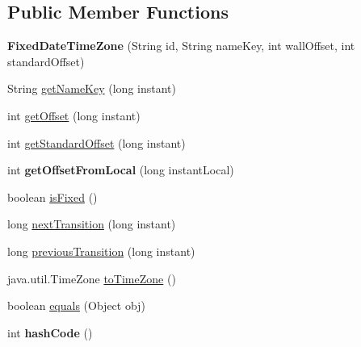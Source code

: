 \subsection*{Public Member Functions}
\begin{DoxyCompactItemize}
\item 
\hypertarget{classorg_1_1joda_1_1time_1_1tz_1_1_fixed_date_time_zone_abcb49765decd77a26771fd6b406f6ad4}{{\bfseries Fixed\-Date\-Time\-Zone} (String id, String name\-Key, int wall\-Offset, int standard\-Offset)}\label{classorg_1_1joda_1_1time_1_1tz_1_1_fixed_date_time_zone_abcb49765decd77a26771fd6b406f6ad4}

\item 
String \hyperlink{classorg_1_1joda_1_1time_1_1tz_1_1_fixed_date_time_zone_ad23b09ef741970f4d5e970ab7a35e299}{get\-Name\-Key} (long instant)
\item 
int \hyperlink{classorg_1_1joda_1_1time_1_1tz_1_1_fixed_date_time_zone_a71d0ef730532bd686ec4880f1e99c36c}{get\-Offset} (long instant)
\item 
int \hyperlink{classorg_1_1joda_1_1time_1_1tz_1_1_fixed_date_time_zone_a04ff48be8fe761996f2c28fdb48d6709}{get\-Standard\-Offset} (long instant)
\item 
\hypertarget{classorg_1_1joda_1_1time_1_1tz_1_1_fixed_date_time_zone_a6f51ab88e73a5e099c6fac996bfc5e66}{int {\bfseries get\-Offset\-From\-Local} (long instant\-Local)}\label{classorg_1_1joda_1_1time_1_1tz_1_1_fixed_date_time_zone_a6f51ab88e73a5e099c6fac996bfc5e66}

\item 
boolean \hyperlink{classorg_1_1joda_1_1time_1_1tz_1_1_fixed_date_time_zone_a7a1217e5b6b53f084d73a0ccbd6b3a04}{is\-Fixed} ()
\item 
long \hyperlink{classorg_1_1joda_1_1time_1_1tz_1_1_fixed_date_time_zone_aabfa96b9f97be46828e7fee6b3bacb6b}{next\-Transition} (long instant)
\item 
long \hyperlink{classorg_1_1joda_1_1time_1_1tz_1_1_fixed_date_time_zone_a847ef81cb34e82ba63d4b37b35575799}{previous\-Transition} (long instant)
\item 
java.\-util.\-Time\-Zone \hyperlink{classorg_1_1joda_1_1time_1_1tz_1_1_fixed_date_time_zone_aba217ab1e9022e34ea35f9fa41ce7473}{to\-Time\-Zone} ()
\item 
boolean \hyperlink{classorg_1_1joda_1_1time_1_1tz_1_1_fixed_date_time_zone_ac240d0606ad4650b904333afb54148e8}{equals} (Object obj)
\item 
\hypertarget{classorg_1_1joda_1_1time_1_1tz_1_1_fixed_date_time_zone_a4a8bf2aed10ba3271dfbf3ac3ccaf90f}{int {\bfseries hash\-Code} ()}\label{classorg_1_1joda_1_1time_1_1tz_1_1_fixed_date_time_zone_a4a8bf2aed10ba3271dfbf3ac3ccaf90f}

\end{DoxyCompactItemize}
